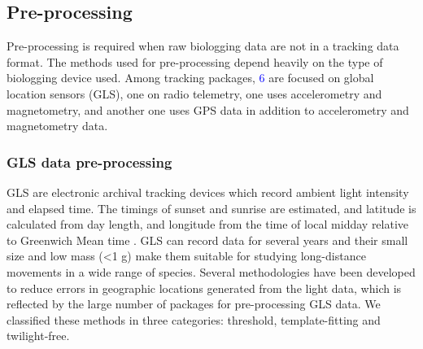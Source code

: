 \documentclass[a4paper,12pt]{article}
\begin{document}
\subsection*{Pre-processing} 

Pre-processing is required when raw biologging data are not in a tracking data format. The methods used for pre-processing depend heavily on the type of biologging device used. Among tracking packages, \textcolor{blue}{6} are focused on global location sensors (GLS), one on radio telemetry, one uses accelerometry and magnetometry, and another one uses GPS data in addition to accelerometry and magnetometry data. %
%

\subsubsection*{GLS data pre-processing} 

GLS are electronic archival tracking devices which record ambient light intensity and elapsed time. The timings of sunset and sunrise are estimated, and latitude is calculated from day length, and longitude from the time of local midday relative to Greenwich Mean time \citep{Afanasyev2004}. GLS can record data for several years and their small size and low mass (<1 g) make them suitable for studying long-distance movements in a wide range of species. Several methodologies have been developed to reduce errors in geographic locations generated from the light data, which is reflected by the large number of packages for pre-processing GLS data. We classified these methods in three categories: threshold, template-fitting and twilight-free.
\end{document}
